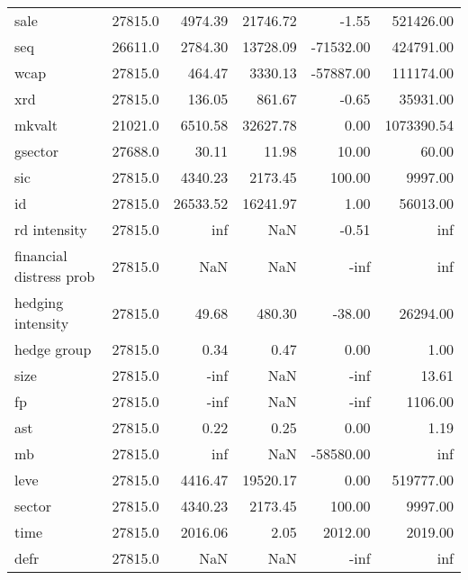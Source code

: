 \begin{tabular}{lrrrrr}
sale                    &  27815.0 &   4974.39 &  21746.72 &      -1.55 &   521426.00 \\
seq                     &  26611.0 &   2784.30 &  13728.09 &  -71532.00 &   424791.00 \\
wcap                    &  27815.0 &    464.47 &   3330.13 &  -57887.00 &   111174.00 \\
xrd                     &  27815.0 &    136.05 &    861.67 &      -0.65 &    35931.00 \\
mkvalt                  &  21021.0 &   6510.58 &  32627.78 &       0.00 &  1073390.54 \\
gsector                 &  27688.0 &     30.11 &     11.98 &      10.00 &       60.00 \\
sic                     &  27815.0 &   4340.23 &   2173.45 &     100.00 &     9997.00 \\
id                      &  27815.0 &  26533.52 &  16241.97 &       1.00 &    56013.00 \\
rd intensity            &  27815.0 &       inf &       NaN &      -0.51 &         inf \\
financial distress prob &  27815.0 &       NaN &       NaN &       -inf &         inf \\
hedging intensity       &  27815.0 &     49.68 &    480.30 &     -38.00 &    26294.00 \\
hedge group             &  27815.0 &      0.34 &      0.47 &       0.00 &        1.00 \\
size                    &  27815.0 &      -inf &       NaN &       -inf &       13.61 \\
fp                      &  27815.0 &      -inf &       NaN &       -inf &     1106.00 \\
ast                     &  27815.0 &      0.22 &      0.25 &       0.00 &        1.19 \\
mb                      &  27815.0 &       inf &       NaN &  -58580.00 &         inf \\
leve                    &  27815.0 &   4416.47 &  19520.17 &       0.00 &   519777.00 \\
sector                  &  27815.0 &   4340.23 &   2173.45 &     100.00 &     9997.00 \\
time                    &  27815.0 &   2016.06 &      2.05 &    2012.00 &     2019.00 \\
defr                    &  27815.0 &       NaN &       NaN &       -inf &         inf \\
\bottomrule
\end{tabular}
